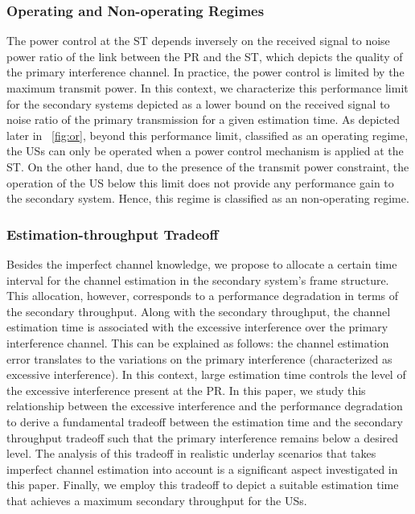 \subsubsection{Operating and Non-operating Regimes}
The power control at the ST depends inversely on the received signal to noise power ratio of the link between the PR and the ST, which depicts the quality of the primary interference channel. In practice, the power control is limited by the maximum transmit power. In this context, we characterize this performance limit for the secondary systems depicted as a lower bound on the received signal to noise ratio of the primary transmission for a given estimation time. As depicted later in \figurename~\ref{fig:or}, beyond this performance limit, classified as an operating regime, the USs can only be operated when a power control mechanism is applied at the ST. On the other hand, due to the presence of the transmit power constraint, the operation of the US below this limit does not provide any performance gain to the secondary system. Hence, this regime is classified as an non-operating regime. 
\subsubsection{Estimation-throughput Tradeoff}
Besides the imperfect channel knowledge, we propose to allocate a certain time interval for the channel estimation in the secondary system's frame structure. This allocation, however, corresponds to a performance degradation in terms of the secondary throughput. Along with the secondary throughput, the channel estimation time is associated with the excessive interference over the primary interference channel. This can be explained as follows: the channel estimation error translates to the variations on the primary interference (characterized as excessive interference). In this context, large estimation time controls the level of the excessive interference present at the PR. In this paper, we study this relationship between the excessive interference and the performance degradation to derive a fundamental tradeoff between the estimation time and the secondary throughput tradeoff such that the primary interference remains below a desired level. The analysis of this tradeoff in realistic underlay scenarios that takes imperfect channel estimation into account is a significant aspect investigated in this paper. Finally, we employ this tradeoff to depict a suitable estimation time that achieves a maximum secondary throughput for the USs. %
